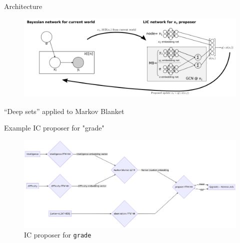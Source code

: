 \begin{frame}{Architecture}
    \begin{figure}
        \centering
        \includegraphics[width=\textwidth]{Figures/lic/schematic-eg.png}
    \end{figure}
    
    ``Deep sets'' \parencite{zaheer2017deep} applied to Markov Blanket
\end{frame}


\begin{frame}[fragile]{Example IC proposer for "grade"}

\begin{figure}
    \centering
    \includegraphics[width=\linewidth]{Figures/lic/ic-grade.png}
    \caption{IC proposer for \texttt{grade}}
\end{figure}

\end{frame}


